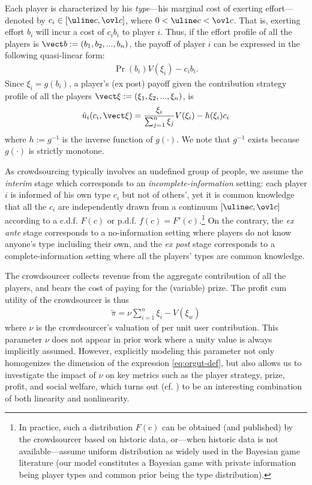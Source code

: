 \documentclass{sig-alternate-10pt}
\begin{document}
Each player is characterized by his {\em type}---his marginal cost of exerting effort---denoted by $c_i\in[\uline c, \ovl c]$, where $0<\uline c<\ovl c$. That is, exerting effort $b_i$ will incur a cost of $c_i b_i$ to player $i$. Thus, if the effort profile of all the players is $\vect b:=(b_1,b_2,...,b_n)$, the payoff of player $i$ can be expressed in the following quasi-linear form:
\begin{align*}
\Pr(b_i) V(\xi_i) - c_i b_i.
\end{align*}
Since $\xi_i=g(b_i)$, a player's (ex post) payoff given the contribution strategy profile of all the players $\vect \xi:=(\xi_1,\xi_2,...,\xi_n)$, is
\begin{align}\label{eq:utdef-expost-inv}
\tilde u_i(c_i, \vect \xi) = \frac{\xi_i}{\sum_{j=1}^n \xi_j} V(\xi_i) - h(\xi_i) c_i
\end{align}
where $h:=g^{-1}$ is the inverse function of $g(\cdot)$. We note that $g^{-1}$ exists because $g(\cdot)$ is strictly monotone.

As crowdsourcing typically involves an undefined group of people,
we assume the {\em interim} stage which corresponds to an {\em incomplete-information} setting: each player $i$ is informed of his own type $c_i$ but not of others', yet it is common knowledge that all the $c_i$ are independently drawn from a continuum $[\uline c, \ovl c]$ according to a c.d.f. $F(c)$ or p.d.f. $f(c)=F'(c)$.\footnote{In practice, such a distribution $F(c)$ can be obtained (and published) by the crowdsourcer based on historic data, or---when historic data is not available---assume uniform distribution as widely used in the Bayesian game literature (our model constitutes a Bayesian game with private information being player types and common prior being the type distribution).}  On the contrary, the {\em ex ante} stage corresponds to a no-information setting where players do not know anyone's type including their own, and the {\em ex post} stage corresponds to a complete-information setting where all the players' types are common knowledge. 

The crowdsourcer collects revenue from the aggregate contribution of all the players, and bears the cost of paying for the (variable) prize. The profit cum utility of the crowdsourcer is thus
\begin{align}\label{eq:orgut-def}
\tilde \pi = \nu \sum_{i=1}^n \xi_i - V(\xi_w)
\end{align}
where $\nu$ is the crowdsourcer's valuation of per unit user contribution. This parameter $\nu$ does not appear in prior work where a unity value is always implicitly assumed. However, explicitly modeling this parameter not only homogenizes the dimension of the expression \eqref{eq:orgut-def}, but also allows us to investigate the impact of $\nu$ on key metrics such as the player strategy, prize, profit, and social welfare, which turns out (cf. ) to be an interesting combination of both linearity and nonlinearity.
\end{document}
